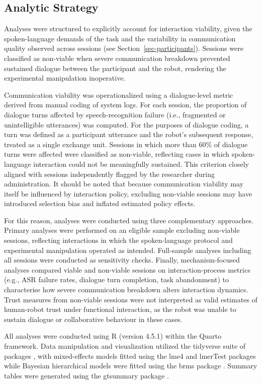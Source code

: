\documentclass[
]{article}
\begin{document}
\subsection{Analytic Strategy}\label{analytic-strategy}

Analyses were structured to explicitly account for interaction
viability, given the spoken-language demands of the task and the
variability in communication quality observed across sessions (see
Section~\ref{sec-participants}). Sessions were classified as non-viable
when severe communication breakdown prevented sustained dialogue between
the participant and the robot, rendering the experimental manipulation
inoperative.

Communication viability was operationalized using a dialogue-level
metric derived from manual coding of system logs. For each session, the
proportion of dialogue turns affected by speech-recognition failure
(i.e., fragmented or unintelligible utterances) was computed. For the
purposes of dialogue coding, a turn was defined as a participant
utterance and the robot's subsequent response, treated as a single
exchange unit. Sessions in which more than 60\% of dialogue turns were
affected were classified as non-viable, reflecting cases in which
spoken-language interaction could not be meaningfully sustained. This
criterion closely aligned with sessions independently flagged by the
researcher during administration. It should be noted that because
communication viability may itself be influenced by interaction policy,
excluding non-viable sessions may have introduced selection bias and
inflated estimated policy effects.

For this reason, analyses were conducted using three complementary
approaches. Primary analyses were performed on an eligible sample
excluding non-viable sessions, reflecting interactions in which the
spoken-language protocol and experimental manipulation operated as
intended. Full-sample analyses including all sessions were conducted as
sensitivity checks. Finally, mechanism-focused analyses compared viable
and non-viable sessions on interaction-process metrics (e.g., ASR
failure rates, dialogue turn completion, task abandonment) to
characterise how severe communication breakdown alters interaction
dynamics. Trust measures from non-viable sessions were not interpreted
as valid estimates of human-robot trust under functional interaction, as
the robot was unable to sustain dialogue or collaborative behaviour in
these cases.

All analyses were conducted using R (version 4.5.1) within the Quarto
framework. Data manipulation and visualization utilized the tidyverse
suite of packages \autocite{wickham2019}, with mixed-effects models
fitted using the lme4 and lmerTest packages
\autocite{bates2015,kuznetsova2017} while Bayesian hierarchical models
were fitted using the brms package \autocite{burkner2018}. Summary
tables were generated using the gtsummary package
\autocite{sjoberg2021}.
\end{document}
